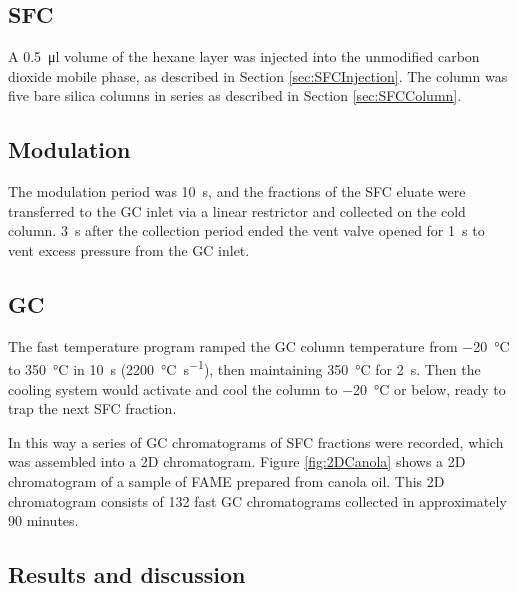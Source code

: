 \subsection{SFC}

A \SI{0.5}{\micro\litre} volume of the hexane layer was injected into the
unmodified carbon dioxide mobile phase, as described in Section
\ref{sec:SFCInjection}. The column was five bare silica columns in series as
described in Section \ref{sec:SFCColumn}. 

\subsection{Modulation}

The modulation period was \SI{10}{\second}, and the fractions of the SFC eluate
were transferred to the GC inlet via a linear restrictor and collected on the
cold column. \SI{3}{\second} after the collection period ended the vent valve
opened for \SI{1}{\second} to vent excess pressure from the GC inlet.

\subsection{GC}

The fast temperature program ramped the GC column temperature from
\SI{-20}{\celsius} to \SI{350}{\celsius} in \SI{10}{s}
(\SI{2200}{\celsius\per\second}), then maintaining \SI{350}{\celsius} for
\SI{2}{\second}. Then the cooling system would activate and cool the column to
\SI{-20}{\celsius} or below, ready to trap the next SFC fraction.

In this way a series of GC chromatograms of SFC fractions were recorded, which
was assembled into a 2D chromatogram. Figure \ref{fig:2DCanola} shows
a 2D chromatogram of a sample of FAME prepared from canola oil. This 2D
chromatogram consists of 132 fast GC chromatograms collected in approximately 90
minutes.

\subsection{Results and discussion}

